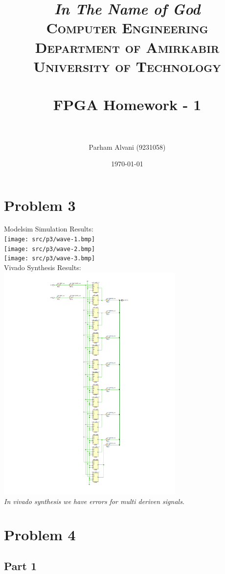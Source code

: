 \documentclass[paper=a4, fontsize=11pt]{scrartcl} %
\title{	
\normalfont \normalsize
\textit{In The Name of God} \\
\textsc{Computer Engineering Department of Amirkabir University of Technology} \\ [25pt]
\horrule{0.5pt} \\[0.4cm] %
\huge FPGA Homework - 1 \\ %
\horrule{2pt} \\[0.5cm] %
}
\author{Parham Alvani (9231058)}
\date{\normalsize\today}
\numberwithin{equation}{section} %
\numberwithin{figure}{section} %
\numberwithin{table}{section} %
\begin{document}
\maketitle


\section{Problem 3}
Modelsim Simulation Results:\\

\texttt{[image: src/p3/wave-1.bmp]}\\
\texttt{[image: src/p3/wave-2.bmp]}\\
\texttt{[image: src/p3/wave-3.bmp]}\\

Vivado Synthesis Results:\\

\includegraphics[height=12cm]{src/p3/schematic.png}\\

\textit{In vivado synthesis we have errors for multi deriven signals.}


\section{Problem 4}
\subsection{Part 1}
\inputminted{vhdl}{src/p4-1-2/p4-1.vhd}
\end{document}
